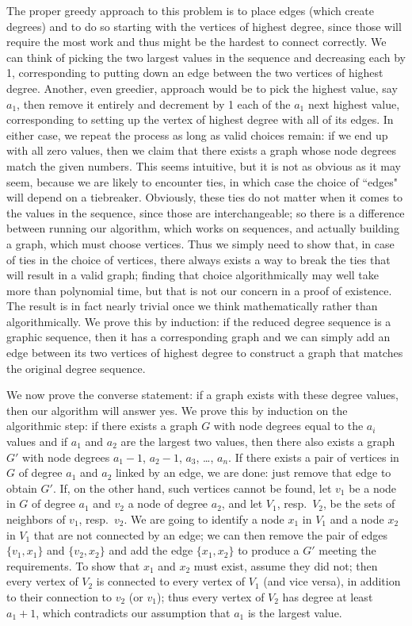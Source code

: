 \documentclass[11pt]{article}
\begin{document}
The proper greedy approach to this problem is to place edges (which create
degrees) and to do so starting with the vertices of highest degree, since
those will require the most work and thus might be the hardest to connect
correctly.  We can think of picking the two largest values in the sequence
and decreasing each by 1, corresponding to putting down an edge between the
two vertices of highest degree.  Another, even greedier, approach would
be to pick the highest value, say $a_1$, then remove it entirely and
decrement by 1 each of the $a_1$ next highest value, corresponding to setting
up the vertex of highest degree with all of its edges.  In either case,
we repeat the process as long as valid choices remain: if we end up with all
zero values, then we claim that there exists a graph whose node degrees match
the given numbers.  This seems intuitive, but it is not as obvious as it may
seem, because we are likely to encounter ties, in which case the choice of
``edges" will depend on a tiebreaker.  Obviously, these ties do not matter
when it comes to the values in the sequence, since those are interchangeable;
so there is a difference between running our algorithm, which works on
sequences, and actually building a graph, which must choose vertices.
Thus we simply need to show that, in case of ties in the choice of vertices,
there always exists a way to break the ties that will result in a valid graph;
finding that choice algorithmically may well take more than polynomial time,
but that is not our concern in a proof of existence.  The result is in fact
nearly trivial once we think mathematically rather than algorithmically.
We prove this by induction: if the reduced degree sequence is a graphic
sequence, then it has a corresponding graph and we can simply add an
edge between its two vertices of highest degree to construct a graph
that matches the original degree sequence.

We now prove the converse statement: if a graph exists with these degree
values, then our algorithm will answer yes.  We prove this by induction on the
algorithmic step: if there exists a graph $G$ with node degrees equal to the
$a_i$ values and if $a_1$ and $a_2$ are the largest two values, then there also
exists a graph $G'$ with node degrees $a_1-1$, $a_2-1$, $a_3$, \ldots, $a_n$.
If there exists a pair of vertices in $G$ of degree $a_1$ and $a_2$
linked by an edge, we are done: just remove that edge to obtain $G'$.
If, on the other hand, such vertices cannot be found, let $v_1$ be a node
in $G$ of degree $a_1$ and $v_2$ a node of degree $a_2$, and let $V_1$, resp.\
$V_2$, be the sets of neighbors of $v_1$, resp.\ $v_2$.  We are going to
identify a node $x_1$ in $V_1$ and a node $x_2$ in $V_1$ that are not connected
by an edge; we can then remove the pair of edges $\{v_1,x_1\}$ and
$\{v_2,x_2\}$ and add the edge $\{x_1,x_2\}$ to produce a $G'$ meeting the
requirements.  To show that $x_1$ and $x_2$ must exist, assume they did not;
then every vertex of $V_2$ is connected to every vertex
of $V_1$ (and vice versa), in addition to their connection to $v_2$ (or $v_1$);
thus every vertex of $V_2$ has degree at least $a_1+1$, which contradicts our
assumption that $a_1$ is the largest value.
\end{document}
